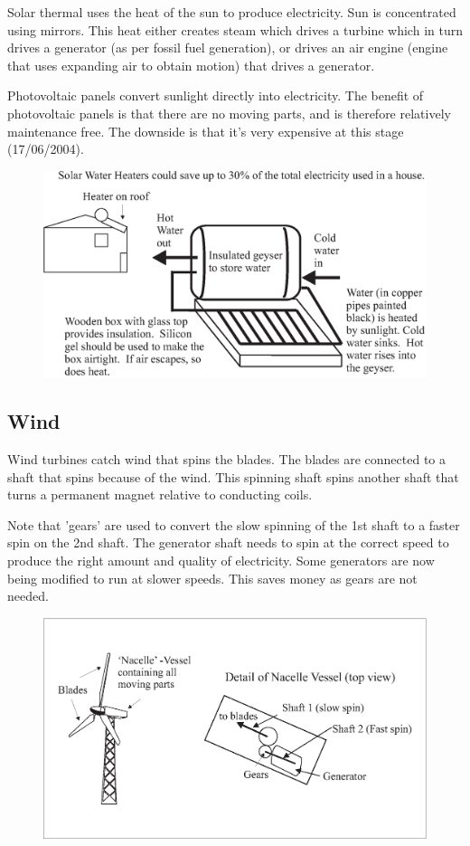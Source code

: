 Solar thermal uses the heat of the sun to produce electricity. Sun
is concentrated using mirrors. This heat either creates steam which
drives a turbine which in turn drives a generator (as per fossil
fuel generation), or drives an air engine (engine that uses
expanding air to obtain motion) that drives a generator.

Photovoltaic panels convert sunlight directly into electricity. The
benefit of photovoltaic panels is that there are no moving parts,
and is therefore relatively maintenance free. The downside is that
it's very expensive at this stage (17/06/2004).

\begin{figure}[H]
\centering
\includegraphics[scale=0.4]{../../epsimages/4solar2.eps}
\end{figure}

\subsection*{Wind}

Wind turbines catch wind that spins the blades. The blades are
connected to a shaft that spins because of the wind. This spinning
shaft spins another shaft that turns a permanent magnet relative to
conducting coils.

Note that 'gears' are used to convert the slow spinning of the 1st
shaft to a faster spin on the 2nd shaft. The generator shaft needs
to spin at the correct speed to produce the right amount and quality
of electricity. Some generators are now being modified to run at
slower speeds. This saves money as gears are not needed.

\begin{figure}[H]
\centering
\includegraphics[scale=0.4]{../../epsimages/5Windturbine.eps}
\end{figure}

